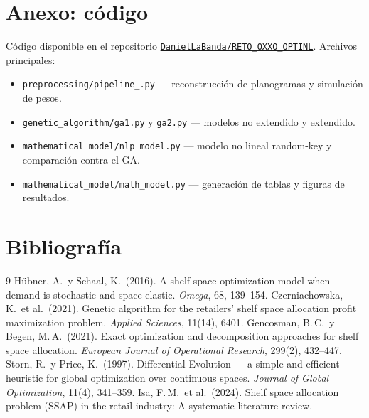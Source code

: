 \documentclass[11pt,letterpaper]{article}
\begin{document}
\section*{Anexo: c\'odigo}
C\'odigo disponible en el repositorio
\href{https://github.com/DanielLaBanda/RETO_OXXO_OPTINL}{\texttt{DanielLaBanda/RETO\_OXXO\_OPTINL}}.
Archivos principales:
\begin{itemize}[leftmargin=1.6em, itemsep=0.15em]
\item \texttt{preprocessing/pipeline\_.py} --- reconstrucci\'on de planogramas y
simulaci\'on de pesos.
\item \texttt{genetic\_algorithm/ga1.py} y \texttt{ga2.py} --- modelos no extendido y
extendido.
\item \texttt{mathematical\_model/nlp\_model.py} --- modelo no lineal random-key y
comparaci\'on contra el GA.
\item \texttt{mathematical\_model/math\_model.py} --- generaci\'on de tablas y
figuras de resultados.
\end{itemize}

\section*{Bibliograf\'ia}
\begin{thebibliography}{9}
 H\"ubner, A.\ y Schaal, K.\ (2016). A shelf-space optimization
model when demand is stochastic and space-elastic. \emph{Omega}, 68, 139--154.
 Czerniachowska, K.\ et al.\ (2021). Genetic algorithm
for the retailers' shelf space allocation profit maximization problem.
\emph{Applied Sciences}, 11(14), 6401.
 Gencosman, B.\,C.\ y Begen, M.\,A.\ (2021). Exact optimization
and decomposition approaches for shelf space allocation. \emph{European Journal of
Operational Research}, 299(2), 432--447.
 Storn, R.\ y Price, K.\ (1997). Differential Evolution --- a
simple and efficient heuristic for global optimization over continuous spaces.
\emph{Journal of Global Optimization}, 11(4), 341--359.
 Isa, F.\,M.\ et al.\ (2024). Shelf space allocation problem (SSAP)
in the retail industry: A systematic literature review.
\end{thebibliography}
\end{document}
